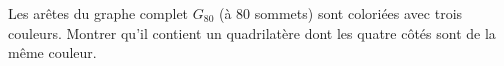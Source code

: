 Les arêtes du graphe complet $G_{80}$ (à $80$ sommets) sont coloriées avec trois couleurs. Montrer qu'il contient un quadrilatère dont les quatre côtés sont de la même couleur.
